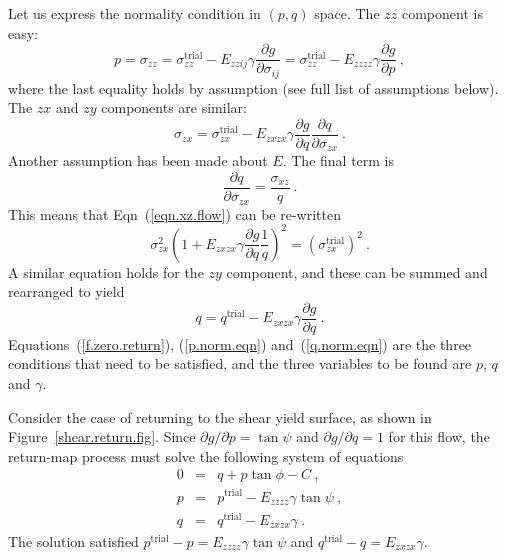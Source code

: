 \documentclass[]{scrreprt}
\begin{document}
Let us express the normality condition in $(p, q)$ space.  The $zz$
component is easy:
\begin{equation}
p = \sigma_{zz} = \sigma_{zz}^{\mathrm{trial}} - E_{zzij}\gamma
\frac{\partial g}{\partial \sigma_{ij}} = \sigma_{zz}^{\mathrm{trial}} - E_{zzzz}\gamma
\frac{\partial g}{\partial p}  \ ,
\label{p.norm.eqn}
\end{equation}
where the last equality holds by assumption (see full list of
assumptions below).  The $zx$ and $zy$ components are similar:
\begin{equation}
\sigma_{zx} = \sigma_{zx}^{\mathrm{trial}} - E_{zxzx}\gamma
\frac{\partial g}{\partial q}\frac{\partial q}{\partial \sigma_{zx}}
\ . \label{eqn.xz.flow}
\end{equation}
Another assumption has been made about $E$.  The final term is
\begin{equation}
\frac{\partial q}{\partial\sigma_{zx}} = \frac{\sigma_{xz}}{q} \ .
\end{equation}
This means that Eqn~(\ref{eqn.xz.flow}) can be re-written
\begin{equation}
\sigma_{zx}^{2} \left( 1 + E_{zxzx}\gamma \frac{\partial g}{\partial
  q} \frac{1}{q} \right)^{2} =
\left(\sigma^{\mathrm{trial}}_{zx}\right)^{2} \ .
\end{equation}
A similar equation holds for the $zy$ component, and these can be
summed and rearranged to yield
\begin{equation}
q = q^{\mathrm{trial}} - E_{zxzx}\gamma \frac{\partial g}{\partial q}
\ . \label{q.norm.eqn}
\end{equation}
Equations~(\ref{f.zero.return}), (\ref{p.norm.eqn})
and~(\ref{q.norm.eqn}) are the three conditions that need to be
satisfied, and the three variables to be found are $p$, $q$ and
$\gamma$.

Consider the case of returning to the shear yield surface, as shown in
Figure~\ref{shear.return.fig}.  Since $\partial g/\partial p =
\tan\psi$ and $\partial g/\partial q = 1$ for this flow, the
return-map process must solve the following system of equations
\begin{eqnarray}
0 & = & q + p\tan\phi - C \ , \\
p & = & p^{\mathrm{trial}} - E_{zzzz}\gamma\tan\psi \ , \\
q & = & q^{\mathrm{trial}} - E_{zxzx}\gamma \ .
\end{eqnarray}
The solution satisfied $p^{\mathrm{trial}} - p =
E_{zzzz}\gamma\tan\psi$ and $q^{\mathrm{trial}} - q = E_{zxzx}\gamma$.
\end{document}
